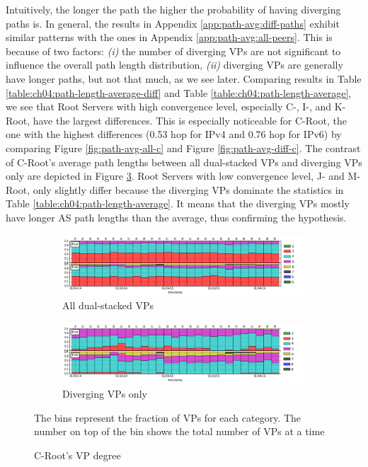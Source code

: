 Intuitively, the longer the path the higher the probability of having diverging paths is. In general, the results in Appendix \ref{app:path-avg:diff-paths} exhibit similar patterns with the ones in Appendix \ref{app:path-avg:all-peers}. This is because of two factors: \textit{(i)} the number of diverging VPs are not significant to influence the overall path length distribution, \textit{(ii)} diverging VPs are generally have longer paths, but not that much, as we see later. Comparing results in Table \ref{table:ch04:path-length-average-diff} and Table \ref{table:ch04:path-length-average}, we see that Root Servers with high convergence level, especially C-, I-, and K-Root, have the largest differences. This is especially noticeable for C-Root, the one with the highest differences (0.53 hop for IPv4 and 0.76 hop for IPv6) by comparing Figure \ref{fig:path-avg-all-c} and Figure \ref{fig:path-avg-diff-c}. The contrast of C-Root's average path lengths between all dual-stacked VPs and diverging VPs only are depicted in Figure \ref{fig:ch04:peer_degree_c}.
Root Servers with low convergence level, J- and M-Root, only slightly differ because the diverging VPs dominate the statistics in Table \ref{table:ch04:path-length-average}. It means that the diverging VPs mostly have longer AS path lengths than the average, thus confirming the hypothesis.

\begin{figure}[!ht]
	\centering
	\begin{subfigure}{1\textwidth}
		\centering
		\includegraphics[width=6.5in]{img/peer_degree_all_c.png}
		\caption{All dual-stacked VPs}
		\label{fig:ch04:peer_degree_all_c}
	\end{subfigure}
	\begin{subfigure}{1\textwidth}
	\includegraphics[width=6.5in]{img/peer_degree_diff_c.png}
	\caption{Diverging VPs only}
	\label{fig:ch04:peer_degree_diff_c}
	\end{subfigure}	
	{\scriptsize The bins represent the fraction of VPs for each category. The number on top of the bin shows the total number of VPs at a time}
	\caption{C-Root's VP degree}
	\label{fig:ch04:peer_degree_c}
\end{figure}
 

